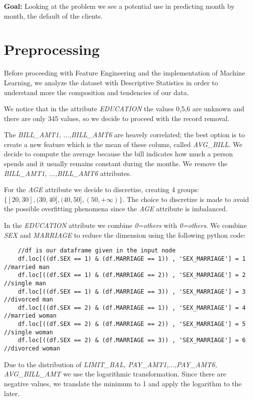 \documentclass[fleqn,10pt]{SelfArx} %
\begin{document}
	
	\textbf{Goal:}\newline
	Looking at the problem we see a potential use in predicting month by month, the default of the clients.
	
	\section{Preprocessing}
	Before proceeding with Feature Engineering and the  implementation of Machine Learning, we analyze the dataset with Descriptive Statistics in order to understand more the composition and tendencies of our data.
	
	We notice that in the attribute \textit{EDUCATION} the values 0,5,6 are unknown and there are only 345 values, so we decide to proceed with the record removal.
	
	The \textit{BILL\_AMT1, $\hdots$,BILL\_AMT6} are heavely correlated; the best option is to create a new feature which is the mean of these colums, called \textit{AVG\_BILL}.
	We decide to compute the average because the bill indicates how much a person spends and it usually remains constant during the months. We remove the \textit{BILL\_AMT1, $\hdots$,BILL\_AMT6} attributes.
	
	For the \textit{AGE} attribute we decide to discretize, creating 4 groups: $\{[20,30],(30,40],(40,50],(50,+\infty)\}$.
	The choice to discretize is made to avoid the possible overfitting phenomena since the \textit{AGE} attribute is imbalanced.
	
	In the \textit{EDUCATION} attribute we combine \textit{0=others} with \textit{0=others}.
	We combine \textit{SEX} and \textit{MARRIAGE} to reduce the dimension using the following python code:
		
	\begin{lstlisting}
	//df is our dataframe given in the input node
	df.loc[((df.SEX == 1) & (df.MARRIAGE == 1)) , 'SEX_MARRIAGE'] = 1 //married man
	df.loc[((df.SEX == 1) & (df.MARRIAGE == 2)) , 'SEX_MARRIAGE'] = 2 //single man
	df.loc[((df.SEX == 1) & (df.MARRIAGE == 3)) , 'SEX_MARRIAGE'] = 3 //divorced man
	df.loc[((df.SEX == 2) & (df.MARRIAGE == 1)) , 'SEX_MARRIAGE'] = 4 //married woman
	df.loc[((df.SEX == 2) & (df.MARRIAGE == 2)) , 'SEX_MARRIAGE'] = 5 //single woman
	df.loc[((df.SEX == 2) & (df.MARRIAGE == 3)) , 'SEX_MARRIAGE'] = 6 //divorced woman
	\end{lstlisting}
	
	Due to the distribution of \textit{LIMIT\_BAL, PAY\_AMT1,$\hdots$,PAY\_AMT6, AVG\_BILL\_AMT} we use the logarithmic transformation. Since there are negative values, we translate the minimum to 1 and apply the logarithm to the later.
	
\end{document}
